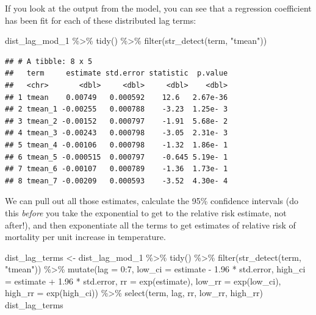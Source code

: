 \documentclass[
]{book}
\newenvironment{Shaded}{\begin{snugshade}}{\end{snugshade}}
\newcommand{\AttributeTok}[1]{\textcolor[rgb]{0.77,0.63,0.00}{#1}}
\newcommand{\DecValTok}[1]{\textcolor[rgb]{0.00,0.00,0.81}{#1}}
\newcommand{\FloatTok}[1]{\textcolor[rgb]{0.00,0.00,0.81}{#1}}
\newcommand{\FunctionTok}[1]{\textcolor[rgb]{0.00,0.00,0.00}{#1}}
\newcommand{\NormalTok}[1]{#1}
\newcommand{\OtherTok}[1]{\textcolor[rgb]{0.56,0.35,0.01}{#1}}
\newcommand{\SpecialCharTok}[1]{\textcolor[rgb]{0.00,0.00,0.00}{#1}}
\newcommand{\StringTok}[1]{\textcolor[rgb]{0.31,0.60,0.02}{#1}}
\begin{document}
If you look at the output from the model, you can see that a regression coefficient has been
fit for each of these distributed lag terms:

\begin{Shaded}
\begin{Highlighting}[]
\NormalTok{dist\_lag\_mod\_1 }\SpecialCharTok{\%\textgreater{}\%} 
  \FunctionTok{tidy}\NormalTok{() }\SpecialCharTok{\%\textgreater{}\%} 
  \FunctionTok{filter}\NormalTok{(}\FunctionTok{str\_detect}\NormalTok{(term, }\StringTok{"tmean"}\NormalTok{))}
\end{Highlighting}
\end{Shaded}

\begin{verbatim}
## # A tibble: 8 x 5
##   term     estimate std.error statistic  p.value
##   <chr>       <dbl>     <dbl>     <dbl>    <dbl>
## 1 tmean    0.00749   0.000592    12.6   2.67e-36
## 2 tmean_1 -0.00255   0.000788    -3.23  1.25e- 3
## 3 tmean_2 -0.00152   0.000797    -1.91  5.68e- 2
## 4 tmean_3 -0.00243   0.000798    -3.05  2.31e- 3
## 5 tmean_4 -0.00106   0.000798    -1.32  1.86e- 1
## 6 tmean_5 -0.000515  0.000797    -0.645 5.19e- 1
## 7 tmean_6 -0.00107   0.000789    -1.36  1.73e- 1
## 8 tmean_7 -0.00209   0.000593    -3.52  4.30e- 4
\end{verbatim}

We can pull out all those estimates, calculate the 95\% confidence intervals (do this \emph{before}
you take the exponential to get to the relative risk estimate, not after!), and then
exponentiate all the terms to get estimates of relative risk of mortality per unit increase
in temperature.

\begin{Shaded}
\begin{Highlighting}[]
\NormalTok{dist\_lag\_terms }\OtherTok{\textless{}{-}}\NormalTok{ dist\_lag\_mod\_1 }\SpecialCharTok{\%\textgreater{}\%} 
  \FunctionTok{tidy}\NormalTok{() }\SpecialCharTok{\%\textgreater{}\%} 
  \FunctionTok{filter}\NormalTok{(}\FunctionTok{str\_detect}\NormalTok{(term, }\StringTok{"tmean"}\NormalTok{)) }\SpecialCharTok{\%\textgreater{}\%} 
  \FunctionTok{mutate}\NormalTok{(}\AttributeTok{lag =} \DecValTok{0}\SpecialCharTok{:}\DecValTok{7}\NormalTok{, }
         \AttributeTok{low\_ci =}\NormalTok{ estimate }\SpecialCharTok{{-}} \FloatTok{1.96} \SpecialCharTok{*}\NormalTok{ std.error, }
         \AttributeTok{high\_ci =}\NormalTok{ estimate }\SpecialCharTok{+} \FloatTok{1.96} \SpecialCharTok{*}\NormalTok{ std.error, }
         \AttributeTok{rr =} \FunctionTok{exp}\NormalTok{(estimate), }
         \AttributeTok{low\_rr =} \FunctionTok{exp}\NormalTok{(low\_ci), }
         \AttributeTok{high\_rr =} \FunctionTok{exp}\NormalTok{(high\_ci)) }\SpecialCharTok{\%\textgreater{}\%} 
  \FunctionTok{select}\NormalTok{(term, lag, rr, low\_rr, high\_rr)}
\NormalTok{dist\_lag\_terms}
\end{Highlighting}
\end{Shaded}
\end{document}
